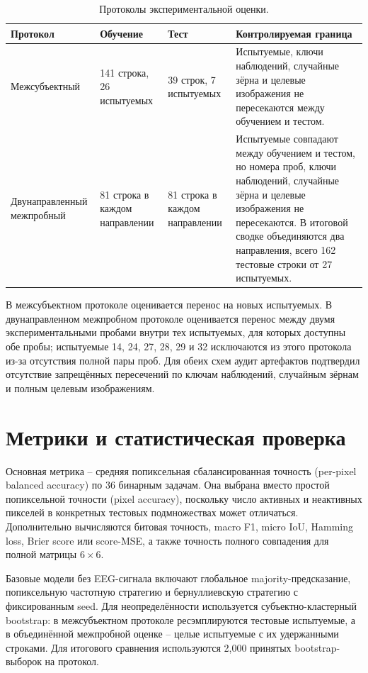 \begin{table}[!t]
  \centering
  \small
  \setlength{\tabcolsep}{3pt}
  \renewcommand{\arraystretch}{1.15}
  \caption{Протоколы экспериментальной оценки.}
  \label{tab:experiment-protocols}
  \begin{tabularx}{\textwidth}{|L{33mm}|L{31mm}|L{31mm}|Y|}
    \hline
    Протокол & Обучение & Тест & Контролируемая граница \\
    \hline
    Межсубъектный &
    141 строка, 26 испытуемых &
    39 строк, 7 испытуемых &
    Испытуемые, ключи наблюдений, случайные зёрна и целевые изображения не
    пересекаются между обучением и тестом. \\
    \hline
    Двунаправленный межпробный &
    81 строка в каждом направлении &
    81 строка в каждом направлении &
    Испытуемые совпадают между обучением и тестом, но номера проб, ключи
    наблюдений, случайные зёрна и целевые изображения не пересекаются. В итоговой
    сводке объединяются два направления, всего 162 тестовые строки от 27
    испытуемых. \\
    \hline
  \end{tabularx}
\end{table}

В межсубъектном протоколе оценивается перенос на новых испытуемых. В
двунаправленном межпробном протоколе оценивается перенос между двумя
экспериментальными пробами внутри тех испытуемых, для которых доступны обе
пробы; испытуемые 14, 24, 27, 28, 29 и 32 исключаются из этого протокола
из-за отсутствия полной пары проб. Для обеих схем аудит артефактов подтвердил
отсутствие запрещённых пересечений по ключам наблюдений, случайным зёрнам и полным
целевым изображениям.

\section{Метрики и статистическая проверка}

Основная метрика -- средняя попиксельная сбалансированная точность
(per-pixel balanced accuracy) по 36 бинарным задачам. Она выбрана вместо
простой попиксельной точности (pixel accuracy), поскольку число активных
и неактивных пикселей в конкретных тестовых подмножествах может отличаться.
Дополнительно вычисляются битовая точность, macro F1, micro IoU, Hamming loss,
Brier score или score-MSE, а также точность полного совпадения для полной
матрицы $6 \times 6$.

Базовые модели без EEG-сигнала включают глобальное majority-предсказание,
попиксельную частотную стратегию и бернуллиевскую стратегию с фиксированным
seed. Для неопределённости используется субъектно-кластерный bootstrap: в
межсубъектном протоколе ресэмплируются тестовые испытуемые, а в объединённой
межпробной оценке -- целые испытуемые с их удержанными строками. Для итогового сравнения
используются 2,000 принятых bootstrap-выборок на протокол.

